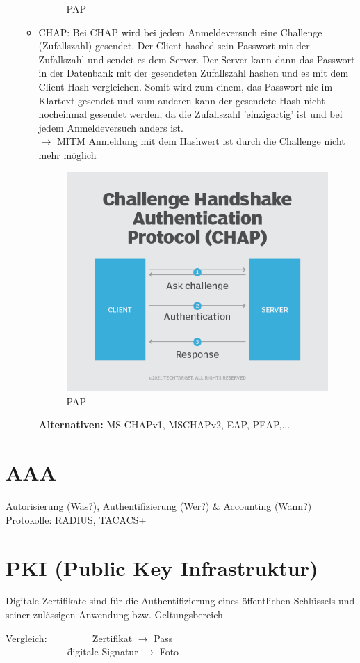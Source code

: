 \begin{enumerate}
\begin{itemize}
\begin{figure}[H]
			\caption{PAP}
		\end{figure}
		\item CHAP: Bei CHAP wird bei jedem Anmeldeversuch eine Challenge (Zufallszahl) gesendet. Der Client hashed sein Passwort mit der Zufallszahl und sendet es dem Server. Der Server kann dann das Passwort in der Datenbank mit der gesendeten Zufallszahl hashen und es mit dem Client-Hash vergleichen. Somit wird zum einem, das Passwort nie im Klartext gesendet und zum anderen kann der gesendete Hash nicht nocheinmal gesendet werden, da die Zufallszahl 'einzigartig' ist und bei jedem Anmeldeversuch anders ist. \\
		$\rightarrow$ MITM Anmeldung mit dem Hashwert ist durch die Challenge nicht mehr möglich
		\begin{figure}[H]
			\centering
			\includegraphics[width=0.6\linewidth]{figures/chap.png}
			\caption{PAP}
		\end{figure}
		\textbf{Alternativen:} MS-CHAPv1, MSCHAPv2, EAP, PEAP,...
	\end{itemize}
\end{enumerate}

\section{AAA}
Autorisierung (Was?), Authentifizierung (Wer?) \& Accounting (Wann?) \\
Protokolle: RADIUS, TACACS+

\section{PKI (Public Key Infrastruktur)}
Digitale Zertifikate sind für die Authentifizierung eines öffentlichen Schlüssels und seiner zulässigen Anwendung bzw. Geltungsbereich 

\begin{tabbing}
	Vergleich: ~~~~~~~~ \= Zertifikat $\rightarrow$ Pass \\
	~~~~~~~~~~~~ \= digitale Signatur $\rightarrow$ Foto
\end{tabbing}


